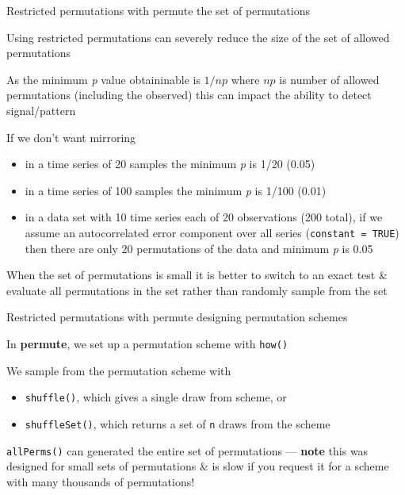 \documentclass[10pt,ignorenonframetext,compress, aspectratio=169]{beamer}
\begin{document}
\begin{frame}{Restricted permutations with permute \textbar{} the set of
permutations}

Using restricted permutations can severely reduce the size of the set of
allowed permutations

As the minimum \emph{p} value obtaininable is \(1 / np\) where \(np\) is
number of allowed permutations (including the observed) this can impact
the ability to detect signal/pattern

If we don't want mirroring

\begin{itemize}
\itemsep1pt\parskip0pt
\item
  in a time series of 20 samples the minimum \emph{p} is 1/20 (0.05)
\item
  in a time series of 100 samples the minimum \emph{p} is 1/100 (0.01)
\item
  in a data set with 10 time series each of 20 observations (200 total),
  if we assume an autocorrelated error component over all series
  (\texttt{constant\ =\ TRUE}) then there are only 20 permutations of
  the data and minimum \emph{p} is 0.05
\end{itemize}

When the set of permutations is small it is better to switch to an exact
test \& evaluate all permutations in the set rather than randomly sample
from the set

\end{frame}

\begin{frame}{Restricted permutations with permute \textbar{} designing
permutation schemes}

In \textbf{permute}, we set up a permutation scheme with \texttt{how()}

We sample from the permutation scheme with

\begin{itemize}
\itemsep1pt\parskip0pt
\item
  \texttt{shuffle()}, which gives a single draw from scheme, or
\item
  \texttt{shuffleSet()}, which returns a set of \texttt{n} draws from
  the scheme
\end{itemize}

\texttt{allPerms()} can generated the entire set of permutations ---
\textbf{note} this was designed for small sets of permutations \& is
slow if you request it for a scheme with many thousands of permutations!

\end{frame}
\end{document}
